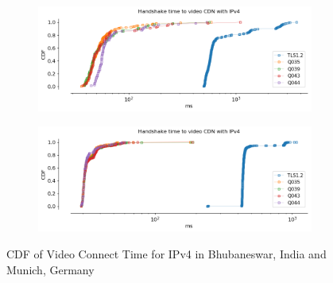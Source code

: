 \begin{frame}
\begin{figure}[!htb]
    \begin{subfigure}{0.45\textwidth}
        \includegraphics[width=\linewidth]{./plots/youtube/india/graph_video_connect_time.png}
    \end{subfigure}
    \begin{subfigure}{0.45\textwidth}
        \includegraphics[width=\linewidth]{./plots/youtube/munich/graph_video_connect_time.png}
    \end{subfigure}    
    \caption{CDF of Video Connect Time for IPv4 in Bhubaneswar, India and Munich, Germany}\label{fig:cdf-of-video}
\end{figure}

\end{frame}
\clearpage

